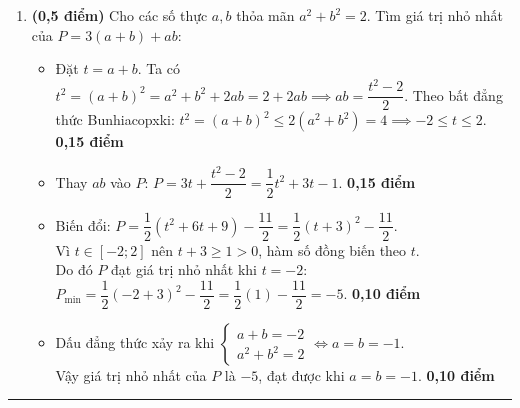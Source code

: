 \documentclass[12pt,a4paper]{article}
\begin{document}
\begin{enumerate}[label=\alph*), leftmargin=18pt, itemsep=2.5pt, parsep=0pt]
\begin{minipage}[t]{0.26\linewidth}
  \end{minipage}

  \item \textbf{(0,5 điểm)} Cho các số thực $a, b$ thỏa mãn $a^2 + b^2 = 2$. Tìm giá trị nhỏ nhất của $P = 3(a + b) + ab$:
  \begin{itemize}[leftmargin=16pt, itemsep=1.5pt, parsep=0pt]
    \item Đặt $t = a + b$. Ta có $t^2 = (a + b)^2 = a^2 + b^2 + 2ab = 2 + 2ab \implies ab = \dfrac{t^2 - 2}{2}$.
    Theo bất đẳng thức Bunhiacopxki: $t^2 = (a + b)^2 \le 2(a^2 + b^2) = 4 \implies -2 \le t \le 2$. \dotfill \textbf{0,15 điểm}
    \item Thay $ab$ vào $P$: $P = 3t + \dfrac{t^2 - 2}{2} = \dfrac{1}{2}t^2 + 3t - 1$. \dotfill \textbf{0,15 điểm}
    \item Biến đổi: $P = \dfrac{1}{2}(t^2 + 6t + 9) - \dfrac{11}{2} = \dfrac{1}{2}(t + 3)^2 - \dfrac{11}{2}$.\\
    Vì $t \in [-2; 2]$ nên $t + 3 \ge 1 > 0$, hàm số đồng biến theo $t$.\\
    Do đó $P$ đạt giá trị nhỏ nhất khi $t = -2$:\\
    $P_{\min} = \dfrac{1}{2}(-2 + 3)^2 - \dfrac{11}{2} = \dfrac{1}{2}(1) - \dfrac{11}{2} = -5$. \dotfill \textbf{0,10 điểm}
    \item Dấu đẳng thức xảy ra khi $\begin{cases} a + b = -2 \\ a^2 + b^2 = 2 \end{cases} \iff a = b = -1$.\\
    Vậy giá trị nhỏ nhất của $P$ là $-5$, đạt được khi $a = b = -1$. \dotfill \textbf{0,10 điểm}
  \end{itemize}
\end{enumerate}

\vspace{2mm}
\hrule
\vspace{2mm}
\end{document}
